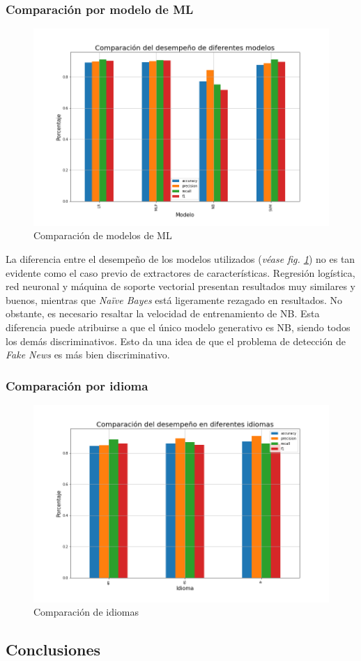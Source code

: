\subsubsection{Comparación por modelo de ML}
\begin{figure}
    \centering
    \includegraphics[width=\textwidth]{results/FakeNewsDetection/model_comparison.png}
    \caption{Comparación de modelos de ML}
    \label{fig:fake_news_models}
\end{figure}

La diferencia entre el desempeño de los modelos utilizados (\textit{véase fig. \ref{fig:fake_news_models}}) no es tan evidente como el caso previo de extractores de características. Regresión logística, red neuronal y máquina de soporte vectorial presentan resultados muy similares y buenos, mientras que \textit{Naïve Bayes} está ligeramente rezagado en resultados. No obstante, es necesario resaltar la velocidad de entrenamiento de NB. Esta diferencia puede atribuirse a que el único modelo generativo es NB, siendo todos los demás discriminativos. Esto da una idea de que el problema de detección de \textit{Fake News} es más bien discriminativo.

\subsubsection{Comparación por idioma}
\begin{figure}
    \centering
    \includegraphics[width=\textwidth]{results/FakeNewsDetection/language_comparison.png}
    \caption{Comparación de idiomas}
    \label{fig:fake_news_languages}
\end{figure}

\subsection{Conclusiones}

